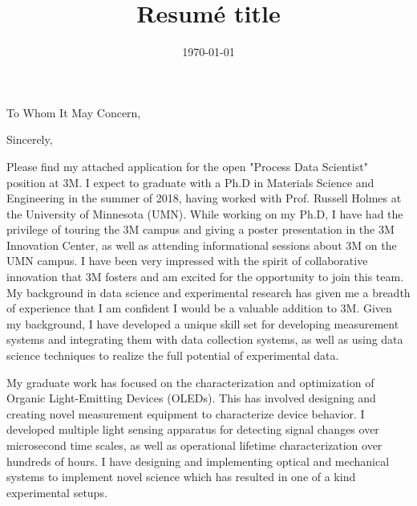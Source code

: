 \documentclass[11pt,a4paper,roman]{moderncv}        %
\title{Resumé title}                               %
\newcommand{\company}{3M}
\newcommand{\shortcompany}{3M}
\begin{document}
\date{\today}
\opening{To Whom It May Concern,}
\closing{Sincerely,}
\makelettertitle
\justify
Please find my attached application for the open "Process Data Scientist" position at \company{}.
I expect to graduate with a Ph.D in Materials Science and Engineering in the summer of 2018, having worked with Prof. Russell Holmes at the University of Minnesota (UMN).
While working on my Ph.D, I have had the privilege of touring the \shortcompany{}  campus and giving a poster presentation in the 3M Innovation Center, as well as attending informational sessions about \company{} on the UMN campus.
I have been very impressed with the spirit of collaborative innovation that \company{} fosters and am excited for the opportunity to join this team.
My background in data science and experimental research has given me a breadth of experience that I am confident I would be a valuable addition to \company{}.
Given my background, I have developed a unique skill set for developing measurement systems and integrating them with data collection systems, as well as using data science techniques to realize the full potential of experimental data.


My graduate work has focused on the characterization and optimization of Organic Light-Emitting Devices (OLEDs).  
This has involved designing and creating novel measurement equipment to characterize device behavior.
I developed multiple light sensing apparatus for detecting signal changes over microsecond time scales, as well as operational lifetime characterization over hundreds of hours.  
I have designing and implementing optical and mechanical systems to implement novel science which has resulted in one of a kind experimental setups.
\end{document}
